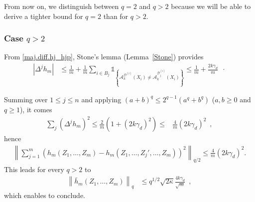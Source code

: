 \documentclass[twoside,11pt]{article}
\numberwithin{equation}{section}
\newcommand{\gp}[1]{\left(#1\right)}
\newcommand{\ga}[1]{\left\{#1\right\}}
\newcommand{\1}{\mathds{1}}%
\newcommand{\ind}[1]{\1_{\ga{#1}}}%
\newcommand{\paren}[1]{\left( #1 \right)}
\newcommand{\norm}[1]{\left\| #1 \right\|}
\newcommand{\abs}[1]{\left\lvert #1 \right\rvert} %
\newcommand{\D}{\mathcal{D}}
\newcommand{\A}{\mathcal{A}}
\numberwithin{equation}{section}
\theoremstyle{plain}
\begin{document}
From now on, we distinguish between $q=2$ and  $q>2$ because we will be able to derive a tighter bound for $q=2$ than for $q>2$.





\subsubsection{Case $q>2$}
%
From \eqref{maj.diff.hj_hjp}, Stone's lemma (Lemma~\ref{Stone}) provides
\begin{align*}
\abs{  \Delta^j h_m }
& \leq \frac{1}{m} + \frac{1}{m} \sum_{i\in B_j} \ind{ \A_k^{\D^{(i)}}\paren{X_i } \neq \A_k^{\D_j^{(i)}}\paren{X_i} }
 \leq \frac{1}{m} + \frac{2k\gamma_d}{m} \enspace\cdot
\end{align*}

Summing over $1\leq j \leq n$ and applying $(a+b)^q \leq 2^{q-1} \paren{a^q + b^q}$ ($a,b\geq 0$ and $q\geq 1$), it comes
\begin{align*}
\sum_j\paren{  \Delta^j h_m }^2 \leq  \frac{2}{m}\gp{ 1 + (2k\gamma_d)^2 }\leq  &  \frac{4}{m}(2k\gamma_d)^2 \enspace,
\end{align*}
%
hence
\begin{align*}
\norm{ \sum_{j=1}^m \paren{ h_m(Z_1,\ldots,Z_m) - h_m(Z_1,\ldots,Z_j',\ldots,Z_m) }^2 }_{q/2} \leq  \frac{4}{m}(2k\gamma_d)^2  .
\end{align*}
%
This leads for every $q > 2$ to
\begin{align*}
  \norm{ \bar h_m(Z_1,\ldots,Z_m) }_q %
%
& \leq q^{1/2} \sqrt{2\kappa}  \frac{4k\gamma_d}{\sqrt{m}} \enspace ,
\end{align*}
which enables to conclude.
\end{document}
